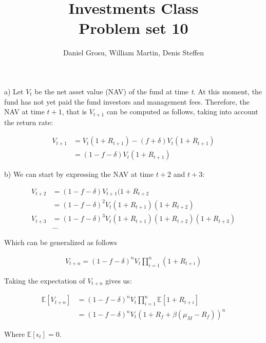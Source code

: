 \documentclass[10pt]{article}
\newenvironment{exercise}[2][Exercise]{\begin{trivlist}
  \item[\hskip \labelsep {\bfseries #1}\hskip \labelsep {\bfseries #2.}]}{\end{trivlist}}
\begin{document}
  \pagecolor{solar}
	
  \renewcommand{\qedsymbol}{\smiley}
	\title{Investments Class \\ Problem set 10}
	\author{Daniel Grosu, William Martin, Denis Steffen}
		
\maketitle

\begin{exercise}{1. Fund performance and fees}
\end{exercise}

\newpage

\begin{exercise}{2. Closed-end funds}
\end{exercise}

a) Let $V_t$ be the net asset value (NAV) of the fund at time \textit{t}. At this moment, the fund has not yet paid the fund investors and management fees. Therefore, the NAV at time $t+1$, that is $V_{t+1}$ can be computed as follows, taking into account the return rate:

\begin{align*}
	V_{t+1} &= V_t(1 + R_{t+1}) - (f + \delta)V_t(1 + R_{t+1})\\
	&= (1 - f - \delta)V_t(1 + R_{t+1})
\end{align*}

b) We can start by expressing the NAV at time $t+2$ and $t+3$:

\begin{align*}
	V_{t+2} &= (1-f-\delta)V_{t+1}(1 + R_{t+2}\\
	&= (1-f-\delta)^2V_t(1 + R_{t+1})(1 + R_{t+2})\\
	V_{t+3} &= (1-f-\delta)^3 V_t (1+R_{t+1})(1+R_{t+2})(1+R_{t+3})\\
	&...
\end{align*}

Which can be generalized as follows

\begin{align*}
	V_{t+n} = (1-f-\delta)^n V_t \prod^n_{i=1}(1 + R_{t+i})
\end{align*}

Taking the expectation of $V_{t+n}$ gives us:

\begin{align*}
	\mathbb{E}[V_{t+n}] &= (1 - f - \delta)^n V_t \prod^n_{i=1} \mathbb{E}[1 + R_{t+i}]\\
	&= (1 - f - \delta)^n V_t \left(1 + R_f +\beta (\mu_M - R_f)\right)^n
\end{align*}

Where $\mathbb{E}[\epsilon_t] = 0$.
\end{document}
